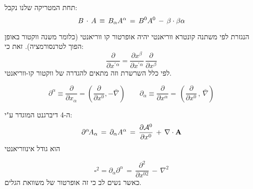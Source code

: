 \documentclass{tstextbook}
\begin{document}
\begin{definition}
תחת המטריקה שלנו נקבל:
$$B\,\cdot\,A\,\equiv\,B_{\alpha}A^{\alpha}\,=\,B^{0}A^{0}\,-\,{\bf\beta}\cdot{\bf\beta}{\bf\alpha}$$

\end{definition}
\begin{proposition}
הנגזרת לפי משתנה קונטרא ווריאנטי יהיה אופרטור קו ווריאנטי (כלומר משנה ווקטור באופן הפוך לטרנסורמציה). זאת כי:
$$\frac{\partial}{\partial x^{\prime}{}^{\alpha}}=\frac{\partial x^{\beta}}{\partial x^{\prime}{}^{\alpha}}\,\frac{\partial}{\partial x^{\beta}}$$
לפי כלל השרשרת וזה מתאים להגדרה של ווקטור קו-ווריאנטי.

\end{proposition}
\begin{definition}[4 גרדיאנט]
$$\partial^{\alpha}\equiv\frac{\partial}{\partial x_{\alpha}}=\left(\frac{\partial}{\partial x^{0}},-\bar\nabla\right)\qquad \partial_{\alpha}\equiv\frac{\partial}{\partial x^{\alpha}}=\,\left(\frac{\partial}{\partial x^{0}}\,,\,{\bar{\nabla}}\right)$$

\end{definition}
\begin{proposition}
ה-4 דיברגנט המוגדר ע"י:
$$\partial^{\alpha}\!{ A}_{\alpha}\,=\,\partial_{\alpha}{A}^{\alpha}\,=\,{\frac{\partial{\cal A}^{0}}{\partial x^{0}}}\,+\,{\bf\nabla\cdot A}$$
הוא גודל אינווריאנטי

\end{proposition}
\begin{definition}[דלמברטיאן]
$$\square^{2}=\partial_{\alpha}\partial^{\alpha}\,=\,\frac{\partial^{2}}{\partial x^{02}}\,-\,\nabla^{2}$$
כאשר נשים לב כי זה אופרטור של משוואת הגלים.

\end{definition}
\end{document}
